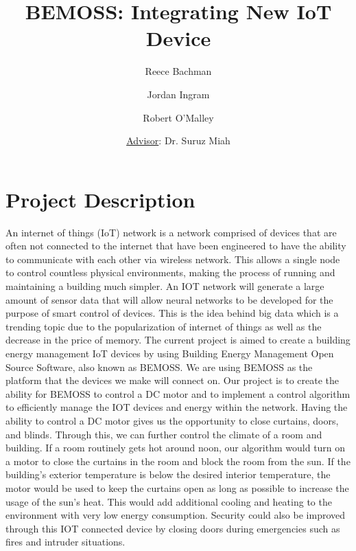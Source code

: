 \documentclass[12pt]{article} %
\title{BEMOSS: Integrating New IoT Device}
\author{Reece Bachman \and Jordan Ingram \and Robert O'Malley \and \underline{Advisor}: Dr. Suruz Miah
}
\begin{document}
\maketitle

\section{Project Description}

An internet of things (IoT) network is a network comprised of devices that are often not connected to the internet that have been engineered to have the ability to communicate with each other via wireless network. This allows a single node to control countless physical environments, making the process of running and maintaining a building much simpler. An IOT network will generate a large amount of sensor data that will allow neural networks to be developed for the purpose of smart control of devices. This is the idea behind big data which is a trending topic due to the popularization of internet of things as well as the decrease in the price of memory.
\newline
\newline
The current project is aimed to create a building energy management IoT devices by using Building Energy Management Open Source Software, also known as BEMOSS. We are using BEMOSS as the platform that the devices we make will connect on. Our project is to create the ability for BEMOSS to control a DC motor and to implement a control algorithm to efficiently manage the IOT devices and energy within the network. Having the ability to control a DC motor gives us the opportunity to close curtains, doors, and blinds. Through this, we can further control the climate of a room and building. If a room routinely gets hot around noon, our algorithm would turn on a motor to close the curtains in the room and block the room from the sun. If the building's exterior temperature is below the desired interior temperature, the motor would be used to keep the curtains open as long as possible to increase the usage of the sun's heat. This would add additional cooling and heating to the environment with very low energy consumption. Security could also be improved through this IOT connected device by closing doors during emergencies such as fires and intruder situations. 
\end{document}
